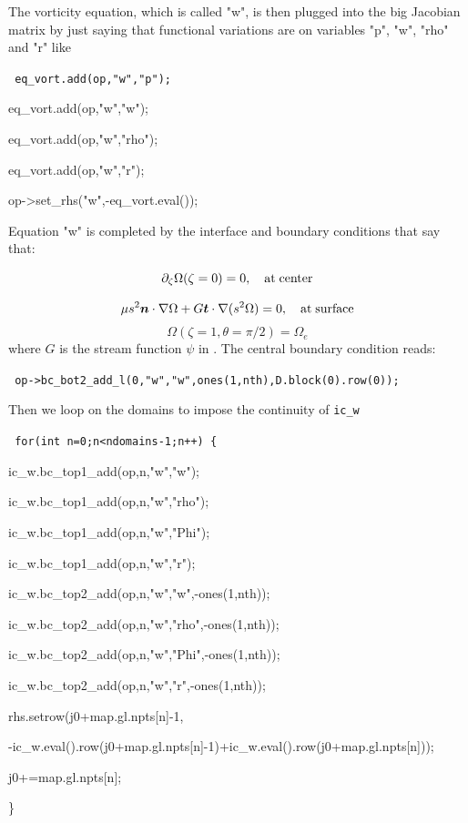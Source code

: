 The vorticity equation, which is called "w", is then plugged into the
big Jacobian matrix by just saying that  functional variations are on
variables "p", "w", "rho" and "r" like

\begin{center}
{\tt
        eq\_vort.add(op,"w","p"); \par
        eq\_vort.add(op,"w","w"); \par
        eq\_vort.add(op,"w","rho"); \par
        eq\_vort.add(op,"w","r"); \par
        op->set\_rhs("w",-eq\_vort.eval()); \par
}

\end{center}
Equation "w" is completed by the interface and boundary conditions that
say that:

\[ \partial_\zeta\Omega(\zeta=0) = 0,\quad {\rm at\; center} \]

\[ \mu s^2\vn\cdot\na\Omega +
G\vec{t}\cdot\na(s^2\Omega)=0,\quad {\rm at\; surface} \]
\[ \Omega(\zeta=1,\theta=\pi/2) = \Omega_e\]
where $G$ is the stream function $\psi$ in .
The central boundary condition reads:
\bigskip

\centerline{\tt
op->bc\_bot2\_add\_l(0,"w","w",ones(1,nth),D.block(0).row(0));}
\bigskip

Then we loop on the domains to impose the continuity of {\tt ic\_w}

\begin{center}
{\tt
        for(int n=0;n<ndomains-1;n++) \{  \par
                ic\_w.bc\_top1\_add(op,n,"w","w");  \par
                ic\_w.bc\_top1\_add(op,n,"w","rho");  \par
                ic\_w.bc\_top1\_add(op,n,"w","Phi");  \par
                ic\_w.bc\_top1\_add(op,n,"w","r");  \par
                ic\_w.bc\_top2\_add(op,n,"w","w",-ones(1,nth));  \par
                ic\_w.bc\_top2\_add(op,n,"w","rho",-ones(1,nth));  \par
                ic\_w.bc\_top2\_add(op,n,"w","Phi",-ones(1,nth));  \par
                ic\_w.bc\_top2\_add(op,n,"w","r",-ones(1,nth));  \par
                rhs.setrow(j0+map.gl.npts[n]-1,  \par
-ic\_w.eval().row(j0+map.gl.npts[n]-1)+ic\_w.eval().row(j0+map.gl.npts[n]));\par
  \par
                j0+=map.gl.npts[n];  \par
        \}  \par
}
\end{center}

